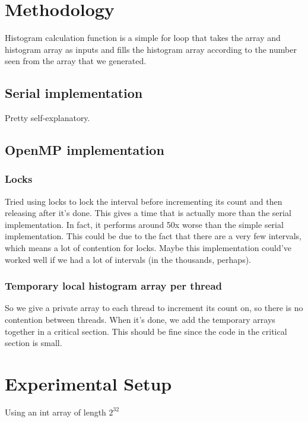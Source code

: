 \documentclass[12pt,letterpaper]{article}
\begin{document}
\section{Methodology}

Histogram calculation function is a simple for loop that takes the array and histogram array as inputs and fills the histogram array according to the number seen from the array that we generated.

 
\subsection{Serial implementation}

Pretty self-explanatory. 

\subsection{OpenMP implementation}

\subsubsection{Locks}

Tried using locks to lock the interval before incrementing its count and then releasing after it's done. This gives a time that is actually more than the serial implementation. In fact, it performs around 50x worse than the simple serial implementation. This could be due to the fact that there are a very few intervals, which means a lot of contention for locks. Maybe this implementation could've worked well if we had a lot of intervals (in the thousands, perhaps).

\subsubsection{Temporary local histogram array per thread}

So we give a private array to each thread to increment its count on, so there is no contention between threads. When it's done, we add the temporary arrays together in a critical section. This should be fine since the code in the critical section is small.

\section{Experimental Setup}

Using an int array of length $2^{32}$
\end{document}
